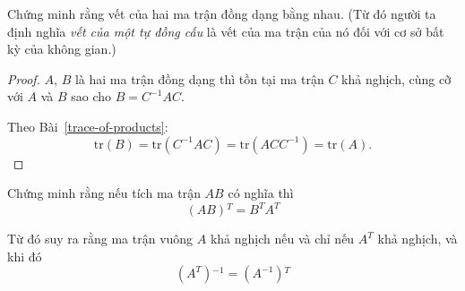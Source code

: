 \documentclass[class=linearalgebra,crop=false]{standalone}
\begin{document}
\begin{exercise}
    Chứng minh rằng vết của hai ma trận đồng dạng bằng nhau. (Từ đó người ta định nghĩa \textit{vết của một tự đồng cấu} là vết của ma trận của nó đối với cơ sở bất kỳ của không gian.)
\end{exercise}

\begin{proof}
    $A$, $B$ là hai ma trận đồng dạng thì tồn tại ma trận $C$ khả nghịch, cùng cỡ với $A$ và $B$ sao cho $B = C^{-1}AC$.
    \par Theo Bài~\ref{trace-of-products}:
    \[
        \text{tr}(B) = \text{tr}(C^{-1}AC) = \text{tr}(ACC^{-1}) = \text{tr}(A).
    \]
\end{proof}

\begin{exercise}
    Chứng minh rằng nếu tích ma trận $AB$ có nghĩa thì
    \[
        (AB){}^{T} = B^{T}A^{T}
    \]
    \par Từ đó suy ra rằng ma trận vuông $A$ khả nghịch nếu và chỉ nếu $A^{T}$ khả nghịch, và khi đó
    \[
        (A^{T}){}^{-1} = (A^{-1}){}^{T}
    \]
\end{exercise}
\end{document}
